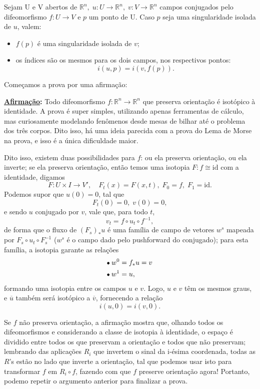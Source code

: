 \documentclass[../differential_topology.tex]{subfiles}
\begin{document}
\begin{theorem*}
	Sejam U e V abertos de \(\mathbb{R}^{n},\; u:U\rightarrow \mathbb{R}^{n},\; v:V\rightarrow \mathbb{R}^{n}\) campos conjugados pelo difeomorfismo \(f:U\rightarrow V\) e \(p\) um ponto de U. Caso \(p\) seja uma singularidade isolada de \(u\), valem:
	\begin{itemize}
		\item[i)] \(f(p)\) é uma singularidade isolada de \(v\);
		\item[ii)] os índices são os mesmos para os dois campos, nos respectivos pontos:
		      \[
			      i(u, p) = i(v, f(p)).
		      \]
	\end{itemize}
\end{theorem*}
\begin{proof*}
	Começamos a prova por uma afirmação:

	\textbf{\underline{Afirmação}:} Todo difeomorfismo \(f:\mathbb{R}^{n}\rightarrow \mathbb{R}^{n}\) que preserva orientação é isotópico à identidade. A prova é super simples, utilizando apenas ferramentas de cálculo, mas curiosamente modelando fenômenos desde mesas de bilhar até o problema dos três corpos.
	Dito isso, há uma ideia parecida com a prova do Lema de Morse na prova, e isso é a única dificuldade maior.

	Dito isso, existem duas possibilidades para \(f\): ou ela preserva orientação, ou ela inverte; se ela preserva orientação, então temos uma isotopia \(F: f \cong \mathrm{id}\) com a identidade, digamos
	\[
		F:U\times I\rightarrow V',\quad  F_{t}(x) = F(x, t),\; F_{0} = f,\; F_{1} = \mathrm{id}.
	\]
	Podemos supor que \(u(0) = 0\), tal que
	\[
		F_{t}(0) = 0,\; v(0) = 0,
	\]
	e sendo \(u\) conjugado por \(v\), vale que, para todo \(t\),
	\[
		v_{t} = f\circ u_{t}\circ f^{-1},
	\]
	de forma que o fluxo de \((F_{s})_{*}u\) é uma família de campo de vetores \(w^{s}\) mapeada por \(F_{s}\circ u_t \circ F_{s}^{-1}\) (\(w^{s}\) é o campo dado pelo pushforward do conjugado); para esta família, a isotopia garante as relações
	\begin{align*}
		 & \tikz[baseline=-0.5ex]\draw[black, fill=black, radius=1.5pt](0, 0)circle;\; w^{0} = f_{*}u = v \\
		 & \tikz[baseline=-0.5ex]\draw[black, fill=black, radius=1.5pt](0, 0)circle;\; w^{1} = u,
	\end{align*}
	formando uma isotopia entre os campos \(u\) e \(v\). Logo, \(u\) e \(v\) têm os mesmos graus, e \(\overline{u}\) também será isotópico a \(\overline{v}\), fornecendo a relação
	\[
		i(u, 0) = i(v, 0).
	\]

	Se \(f\) não preserva orientação, a afirmação mostra que, olhando todos os difeomorfismos e considerando a classe de isotopia à identidade, o espaço é dividido entre todos os que preservam a orientação e todos que não preservam; lembrando das aplicações \(R_{i}\) que invertem o sinal da i-ésima coordenada, todas as \(R\)'s estão no lado que inverte a orientação, tal que podemos usar isto para transformar \(f\) em \(R_{i}\circ f\), fazendo com que \(f\) preserve orientação agora! Portanto, podemo repetir o argumento anterior para finalizar a prova. \qedsymbol
\end{proof*}
\end{document}
